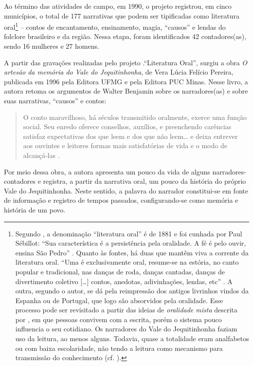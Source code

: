\documentclass[portuguese]{textolivre}
\begin{document}
Ao término das atividades de campo, em 1990, o projeto registrou, em cinco municípios, o total de 177 narrativas que podem ser tipificadas como literatura oral\footnote{Segundo \textcite{Cascudo1984}, a denominação “literatura oral” é de 1881 e foi cunhada por Paul Sébillot: “Sua característica é a persistência pela oralidade. A fé é pelo ouvir, ensina São Pedro” \cite[p. 23]{Cascudo1984}. Quanto às fontes, há duas que mantêm viva a corrente da literatura oral. “Uma é exclusivamente oral, resume-se na estória, no canto popular e tradicional, nas danças de roda, danças cantadas, danças de divertimento coletivo […] contos, anedotas, adivinhações, lendas, etc” \cite[p. 23]{Cascudo1984}. A outra, segundo o autor, se dá pela reimpressão dos antigos livrinhos vindos da Espanha ou de Portugal, que logo são absorvidos pela oralidade. Esse processo pode ser revisitado a partir das ideias de \textit{oralidade mista} descrita por \textcite{Zumthor1993}, em que pessoas convivem com a escrita, porém o sistema pouco influencia o seu cotidiano. Os narradores do Vale do Jequitinhonha faziam uso da leitura, ao menos alguns. Todavia, quase a totalidade eram analfabetos ou com baixa escolaridade, não tendo a leitura como mecanismo para transmissão do conhecimento
(cf. \textcite[p. 67-80]{Poletto2025}).} – contos de encantamento, ensinamento, magia, “causos” e lendas do folclore brasileiro e da região. Nessa etapa, foram identificados 42 contadores(as), sendo 16 mulheres e 27 homens.

A partir das gravações realizadas pelo projeto .“Literatura Oral”, surgiu a obra \textit{O artesão da memória do Vale do Jequitinhonha}, de Vera Lúcia Felício Pereira, publicada em 1996 pela Editora UFMG e pela Editora PUC Minas. Nesse livro, a autora retoma os argumentos de Walter Benjamin sobre os narradores(as) e sobre suas narrativas, “causos” e contos:

\begin{quote}
    O conto maravilhoso, há séculos transmitido oralmente, exerce uma função social. Seu enredo oferece conselhos, auxílios, e preenchendo carências satisfaz expectativas dos que leem e dos que não leem… e deixa entrever aos ouvintes e leitores formas mais satisfatórias de vida e o modo de alcançá-las \cite[p. 51]{Pereira1996}.
\end{quote}

Por meio dessa obra, a autora apresenta um pouco da vida de alguns narradores-contadores e registra, a partir da narrativa oral, um pouco da história do próprio Vale do Jequitinhonha. Neste sentido, a palavra do narrador constitui-se em fonte de informação e registro de tempos passados, configurando-se como memória e história de um povo.
\end{document}
